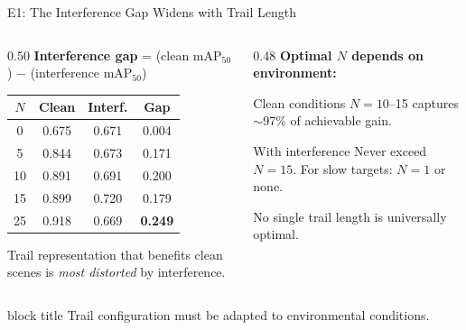 \documentclass[aspectratio=169, 10pt]{beamer}
\newcommand{\maptf}{\text{mAP}_{50}}
\newcommand{\keypoint}[1]{%
  \vfill
  \begin{beamercolorbox}[wd=\textwidth, dp=0.4em, leftskip=0.3cm]{block title}%
    \small #1%
  \end{beamercolorbox}%
}
\begin{document}
\begin{frame}{E1: The Interference Gap Widens with Trail Length}

\begin{columns}[T]
\begin{column}{0.50\textwidth}
  \textbf{Interference gap} = (clean $\maptf$) $-$ (interference $\maptf$)

  \vspace{0.3cm}

  \begin{tabular}{@{}c c c c@{}}
    \toprule
    $N$ & Clean & Interf. & \textbf{Gap} \\
    \midrule
    0 & 0.675 & 0.671 & 0.004 \\
    5 & 0.844 & 0.673 & 0.171 \\
    10 & 0.891 & 0.691 & 0.200 \\
    15 & 0.899 & 0.720 & 0.179 \\
    25 & 0.918 & 0.669 & \textcolor{Rose}{\textbf{0.249}} \\
    \bottomrule
  \end{tabular}

  \vspace{0.3cm}

  Trail representation that benefits clean scenes is \textit{most distorted}
  by interference.
\end{column}
\begin{column}{0.48\textwidth}
  \textbf{Optimal $N$ depends on environment:}

  \vspace{0.3cm}

  \begin{block}{Clean conditions}
    $N{=}10$--15 captures $\sim$97\% of achievable gain.
  \end{block}

  \vspace{0.2cm}

  \begin{block}{With interference}
    Never exceed $N{=}15$. For slow targets: $N{=}1$ or none.
  \end{block}

  \vspace{0.3cm}

  No single trail length is universally optimal.
\end{column}
\end{columns}

\keypoint{Trail configuration must be adapted to environmental conditions.}
\end{frame}
\end{document}
